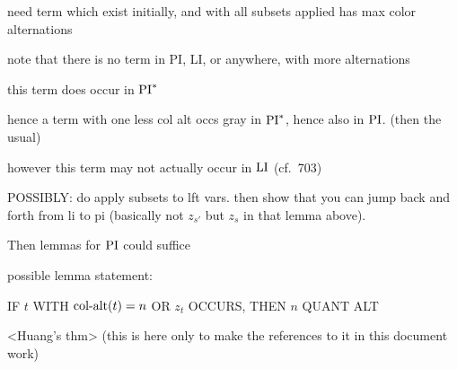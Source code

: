\documentclass[%
	draft=false,%
	numbers=noendperiod,%
	11pt,%
	a4paper,%
	oneside,%
	openany,%
]{memoir}
\begin{document}
\begin{clemma}
	need term which exist initially, and with all subsets applied has max color alternations

	note that there is no term in PI, LI, or anywhere, with more alternations

	this term does occur in $\operatorname{PI}^*$

	hence a term with one less col alt occs gray in $\operatorname{PI}^*$, hence also in $\operatorname{PI}$. (then the usual)

	however this term may not actually occur in $\operatorname{LI}$ (cf.\ 703)

	POSSIBLY: do apply subsets to lft vars. then show that you can jump back and forth from li to pi (basically not $z_{s'}$ but $z_s$ in that lemma above).

	Then lemmas for $\operatorname{PI}$ could suffice

	possible lemma statement:

	IF $t$ WITH $\operatorname{col-alt}(t) = n$ OR $z_t$ OCCURS, THEN $n$ QUANT ALT
\end{clemma}

\vfill
\begin{thm}
	<Huang's thm> (this is here only to make the references to it in this document work)
	\label{thm:two_phases}
\end{thm}
\end{document}
